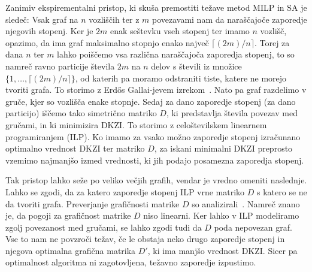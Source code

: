 \documentclass[fin1, tisk]{fmfdelo}
\newcommand{\R}{\mathbb R}
\newcommand{\cM}{\operatorname{cM}_2}
\newcommand{\VV}{\mathbf{V}}
\begin{document}
Zanimiv ekspirementalni pristop, ki skuša premostiti težave metod MILP in SA je sledeč: 
Vsak graf na $n$ vozliščih ter z $m$ povezavami nam da naraščajoče zaporedje njegovih stopenj. Ker je $2m$ 
enak seštevku vseh stopenj ter imamo $n$ vozlišč, opazimo, da ima graf maksimalno stopnjo enako največ 
$\lceil (2m)/n \rceil$. Torej za dana $n$ ter $m$ lahko poiščemo vsa različna naraščajoča zaporedja stopenj, 
to so namreč ravno particije števila $2m$ na $n$ delov s števili iz množice $\{1, \ldots, \lceil (2m)/n \rceil\}$, 
od katerih pa moramo odstraniti tiste, katere ne morejo tvoriti grafa. To storimo z Erdős Gallai-jevem 
izrekom~\cite{erdos}. Nato pa graf razdelimo v gruče, kjer so vozlišča enake stopnje. Sedaj za dano 
zaporedje stopenj (za dano particijo) iščemo tako simetrično matriko $D$, ki predstavlja števila povezav 
med gručami, in ki minimizira DKZI. To storimo z celoštevilskem linearnem programiranjem (ILP). Ko imamo za vsako 
možno zaporedje stopenj izračunano optimalno vrednost DKZI ter matriko $D$, za iskani minimalni DKZI preprosto 
vzemimo najmanjšo izmed vrednosti, ki jih podajo posamezna zaporedja stopenj.

\begin{opomba}
  Tak pristop lahko seže po veliko večjih grafih, vendar je vredno omeniti naslednje. Lahko se zgodi, da 
  za katero zaporedje stopenj ILP vrne matriko $D$ s katero se ne da tvoriti grafa. Preverjanje grafičnosti 
  matrike $D$ so analizirali~\textcite{jdm}. Namreč znano je, da 
  pogoji za grafičnost matrike $D$ niso linearni. Ker lahko v ILP modeliramo zgolj povezanost med gručami, 
  se lahko zgodi tudi da $D$ poda nepovezan graf. Vse to nam ne povzroči težav, če le obstaja neko drugo 
  zaporedje stopenj in njegova optimalna grafična matrika $D'$, ki ima manjšo vrednost DKZI. Sicer pa 
  optimalnost algoritma ni zagotovljena, težavno zaporedje izpustimo.
\end{opomba}


\end{document}
